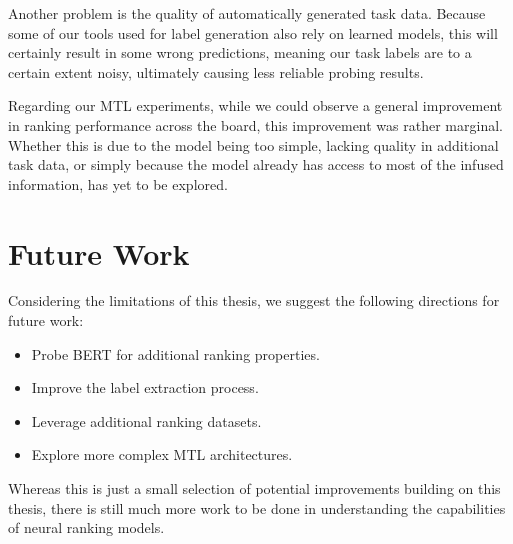 Another problem is the quality of automatically generated task data. Because some of our tools used for label generation also rely on learned models, this will certainly result in some wrong predictions, meaning our task labels are to a certain extent noisy, ultimately causing less reliable probing results.

Regarding our MTL experiments, while we could observe a general improvement in ranking performance across the board, this improvement was rather marginal. Whether this is due to the model being too simple, lacking quality in additional task data, or simply because the model already has access to most of the infused information, has yet to be explored.

\section{Future Work}
\label{sec:future}
Considering the limitations of this thesis, we suggest the following directions for future work:
\begin{itemize}
    \item Probe BERT for additional ranking properties.
    \item Improve the label extraction process.
    \item Leverage additional ranking datasets.
    \item Explore more complex MTL architectures.
\end{itemize}
Whereas this is just a small selection of potential improvements building on this thesis, there is still much more work to be done in understanding the capabilities of neural ranking models.
